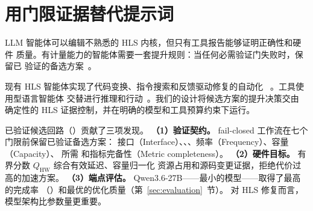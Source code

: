 \section{用门限证据替代提示词}

LLM 智能体可以编辑不熟悉的 HLS 内核，但只有工具报告能够证明正确性和硬件
质量。有计量能力的智能体需要一套提升规则：当任何必需验证门失败时，保留已
验证的备选方案~\cite{amd2025vitis}。

现有 HLS 智能体实现了代码变换、指令搜索和反馈驱动修复的自动化
~\cite{xiong2024hlspilot,xu2024ralad,li2026chathls}。工具使用型语言智能体
交替进行推理和行动~\cite{yao2023react}。我们的设计将候选方案的提升决策交由
确定性的 HLS 证据控制，并在明确的模型和工具预算约束下运行。

已验证候选回路（\VCL）贡献了三项发现。
\textbf{（1）验证契约。} fail-closed 工作流在七个门限前保留已验证备选方案：
接口（Interface）、\CSim、\Synth、频率（Frequency）、容量（Capacity）、
所需 \CoSim{} 和指标完备性（Metric completeness）。
\textbf{（2）硬件目标。} 有界分数 $Q_{\mathrm{HW}}$ 综合有效延迟、容量归一化
资源占用和源码变更证据，拒绝代价过高的加速方案。
\textbf{（3）端点评估。} Qwen3.6-27B——最小的模型——取得了最高的完成率
（\QwenThreeSixSuccessRate）和最优的优化质量（第~\ref{sec:evaluation}~节）。
对 HLS 修复而言，模型架构比参数量更重要。
